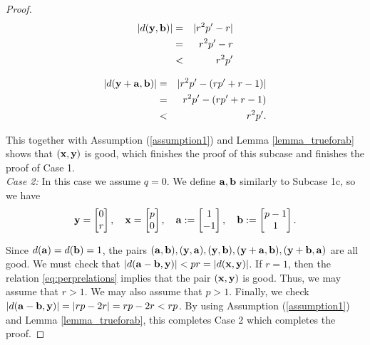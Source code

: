 \begin{proof}
	\begin{eqnarray*}
		\lvert d({\mathbf{y}},{\mathbf{b}})\rvert &=&  \lvert r^2p' - r \rvert \\
		&=& r^2p' - r \\
		&<& r^2p'
	\end{eqnarray*}

	\begin{eqnarray*}
		\lvert d({\mathbf{y}}+{\mathbf{a}}, {\mathbf{b}})\rvert &=&  \lvert r^2p' - (rp'+r-1) \rvert \\
		&=&  r^2p' - (rp'+r-1) \\
		&<& r^2p'.
	\end{eqnarray*}

This together with Assumption (\ref{assumption1}) and Lemma \ref{lemma_trueforab} shows that $({\mathbf{x}},{\mathbf{y}})$ is good, which finishes the proof of this subcase and finishes the proof of Case 1. \\[2mm]
	
	\noindent \emph{Case 2:} In this case we assume $q=0$. We define ${\mathbf{a}}, {\mathbf{b}}$ similarly to Subcase 1c, so we have
	\[
	{\mathbf{y}} = \begin{bmatrix} 0\\r\end{bmatrix},\quad {\mathbf{x}} = \begin{bmatrix} p\\0\end{bmatrix},\quad {\mathbf{a}} := \begin{bmatrix} 1\\-1 \end{bmatrix},\quad {\mathbf{b}} := \begin{bmatrix} p-1\\ 1 \end{bmatrix}.
	\]

	Since $d({\mathbf{a}}) = d({\mathbf{b}}) = 1$, the pairs $({\mathbf{a}},{\mathbf{b}}), ({\mathbf{y}},{\mathbf{a}}), ({\mathbf{y}},{\mathbf{b}}), ({\mathbf{y}}+{\mathbf{a}},{\mathbf{b}}), ({\mathbf{y}}+{\mathbf{b}},{\mathbf{a}})$ are all good. We must check that $\lvert d({\mathbf{a}}-{\mathbf{b}},{\mathbf{y}}) \rvert < pr = \lvert d({\mathbf{x}},{\mathbf{y}}) \rvert$. If $r=1$, then the relation \eqref{eq:perprelations} implies that the pair $({\mathbf{x}},{\mathbf{y}})$ is good. Thus, we may assume that $r>1$. We may also assume that $p>1$. Finally, we check $\lvert d({\mathbf{a}}-{\mathbf{b}},{\mathbf{y}}) \rvert = \lvert rp-2r \rvert = rp-2r < rp$. By using Assumption (\ref{assumption1}) and Lemma \ref{lemma_trueforab}, this completes Case 2 which completes the proof. 
\end{proof}


